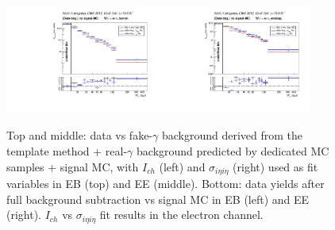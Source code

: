 \begin{figure}[htb]
\begin{center}
\includegraphics[width=0.45\textwidth]{../figs/figs_v11/ELECTRON_WGamma/PrepareYields/c_BkgSubtrDATAvsSIGMC_c_ELECTRON_WGamma__UNblind__Barrel__phoEt.pdf}\includegraphics[width=0.45\textwidth]{../figs/figs_v11/ELECTRON_WGamma/PrepareYields/c_BkgSubtrDATAvsSIGMC_c_ELECTRON_WGamma__UNblind__Endcap__phoEt.pdf}\\
  \caption{Top and middle: data vs fake-$\gamma$ background derived from the template method + real-$\gamma$ background predicted by dedicated MC samples + signal MC, with $I_{ch}$ (left) and $\sigma_{i\eta i\eta}$ (right) used as fit variables in EB (top) and EE (middle). Bottom: data yields after full background subtraction vs signal MC in EB (left) and EE (right). $I_{ch}$ vs $\sigma_{i\eta i\eta}$ fit results in the electron channel.}
  \label{fig:DDvsMC_Wg_Data_ELECTRON}
  \end{center}
\end{figure}

\clearpage

